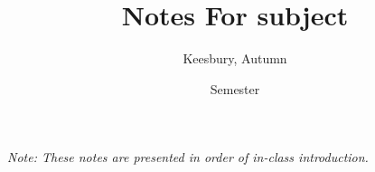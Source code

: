 \documentclass{amsart}
\title{\textbf{Notes For} subject}
\date{Semester}
\author{Keesbury, Autumn}
\begin{document}
\maketitle


\textit{Note: These notes are presented in order of in-class introduction.}
\tableofcontents

\newpage

\end{document}
